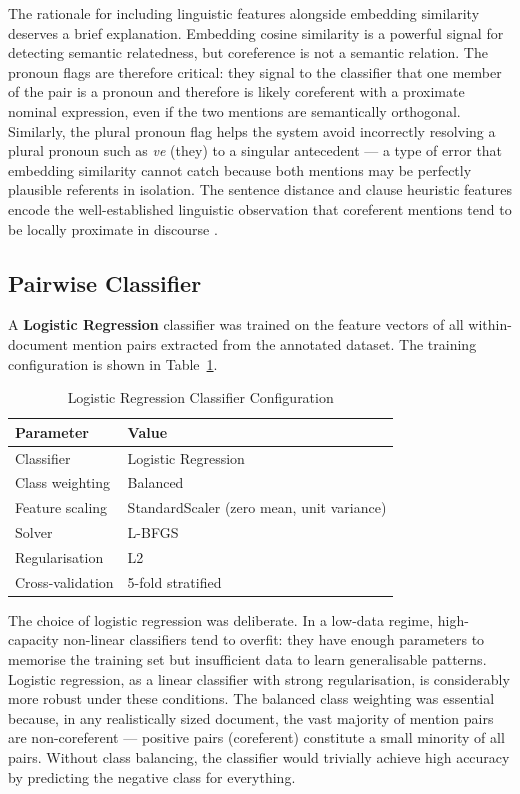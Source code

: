 \documentclass[12pt,a4paper]{report}
\begin{document}
\noindent The rationale for including linguistic features alongside embedding similarity deserves a brief explanation. Embedding cosine similarity is a powerful signal for detecting semantic relatedness, but coreference is not a semantic relation. The pronoun flags are therefore critical: they signal to the classifier that one member of the pair is a pronoun and therefore is likely coreferent with a proximate nominal expression, even if the two mentions are semantically orthogonal. Similarly, the plural pronoun flag helps the system avoid incorrectly resolving a plural pronoun such as \textit{ve} (they) to a singular antecedent --- a type of error that embedding similarity cannot catch because both mentions may be perfectly plausible referents in isolation. The sentence distance and clause heuristic features encode the well-established linguistic observation that coreferent mentions tend to be locally proximate in discourse \cite{lappin1994algorithm}.

\subsection{Pairwise Classifier}

A \textbf{Logistic Regression} classifier was trained on the feature vectors of all within-document mention pairs extracted from the annotated dataset. The training configuration is shown in Table~\ref{tab:clf_config}.

\begin{table}[H]
\centering
\caption{Logistic Regression Classifier Configuration}
\label{tab:clf_config}
\begin{tabular}{|l|l|}
\hline
\textbf{Parameter} & \textbf{Value} \\
\hline
Classifier & Logistic Regression \\
Class weighting & Balanced \\
Feature scaling & StandardScaler (zero mean, unit variance) \\
Solver & L-BFGS \\
Regularisation & L2 \\
Cross-validation & 5-fold stratified \\
\hline
\end{tabular}
\end{table}

\noindent The choice of logistic regression was deliberate. In a low-data regime, high-capacity non-linear classifiers tend to overfit: they have enough parameters to memorise the training set but insufficient data to learn generalisable patterns. Logistic regression, as a linear classifier with strong regularisation, is considerably more robust under these conditions. The balanced class weighting was essential because, in any realistically sized document, the vast majority of mention pairs are non-coreferent --- positive pairs (coreferent) constitute a small minority of all pairs. Without class balancing, the classifier would trivially achieve high accuracy by predicting the negative class for everything.
\end{document}
